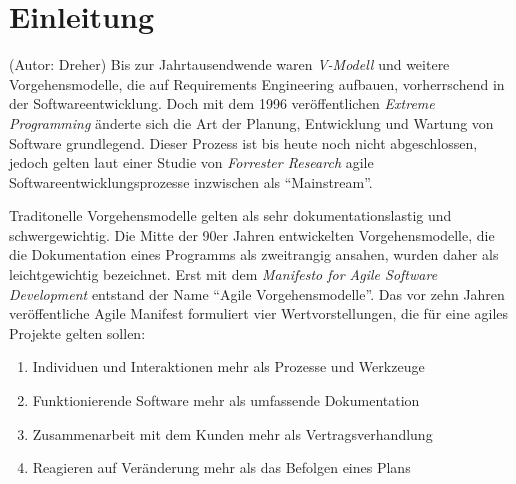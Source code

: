 \section{Einleitung}
(Autor: Dreher)
\label{sec:einfuehrung}
Bis zur Jahrtausendwende waren \emph{V-Modell} und weitere Vorgehensmodelle, die auf Requirements Engineering aufbauen, vorherrschend in der Softwareentwicklung. Doch mit dem 1996 veröffentlichen \emph{Extreme Programming} änderte sich die Art der Planung, Entwicklung und Wartung von Software grundlegend. Dieser Prozess ist bis heute noch nicht abgeschlossen, jedoch gelten laut einer Studie von \emph{Forrester Research} agile Softwareentwicklungsprozesse inzwischen als ``Mainstream''. \cite{bib:ane}

Traditonelle Vorgehensmodelle gelten als sehr dokumentationslastig und schwergewichtig. Die Mitte der 90er Jahren entwickelten Vorgehensmodelle, die die Dokumentation eines Programms als zweitrangig ansahen, wurden daher als leichtgewichtig bezeichnet. Erst mit dem \emph{Manifesto for Agile Software Development} \cite{bib:manifest} entstand der Name ``Agile Vorgehensmodelle''. \cite{bib:eckstein} Das vor zehn Jahren veröffentliche Agile Manifest formuliert vier Wertvorstellungen, die für eine agiles Projekte gelten sollen:
\begin{enumerate}
	\item Individuen und Interaktionen mehr als Prozesse und Werkzeuge
	\item Funktionierende Software mehr als umfassende Dokumentation
	\item Zusammenarbeit mit dem Kunden mehr als Vertragsverhandlung
	\item Reagieren auf Veränderung mehr als das Befolgen eines Plans
\end{enumerate}

